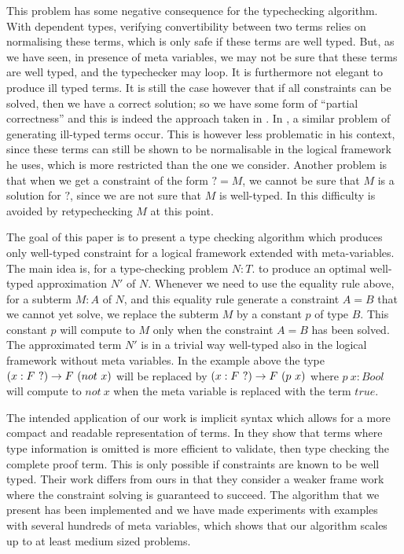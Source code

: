 This problem has some negative consequence for the typechecking algorithm. With dependent types,
verifying convertibility between two 
terms relies on normalising these terms, which is only safe if these terms are well typed. But, as we
have seen, in presence of meta variables, we may not be sure that these terms are well typed, and the
typechecker may loop. It is furthermore not elegant to produce ill typed terms.
It is still the case however that if all constraints can be solved, then we have a correct solution; so we
have some form of ``partial correctness'' and this is indeed the approach taken in 
\cite{magnussonnordstrom:alf,coquand:stt-lfm99}. In \cite{elliot:unification}, a similar problem of generating
ill-typed terms occur. This is however less problematic in his context, since these terms can still be shown
to be normalisable in the logical framework he uses, which is more restricted than the one we consider.
Another problem is that when we get a constraint of the form $? = M$, we cannot be sure that $M$ is a solution
for $?$, since we are not sure that $M$ is well-typed. In \cite{magnussonnordstrom:alf,coquand:stt-lfm99}
this difficulty is avoided by retypechecking $M$ at this point. 


 The goal of this paper is to present a type checking algorithm which produces only well-typed constraint  for a logical framework extended with meta-variables. The main idea is,
for a type-checking problem $N:T$.
to produce an optimal well-typed approximation $N'$ of $N$. 
Whenever we need to use the equality rule above, for a subterm $M:A$ of $N$, and this
equality rule generate a constraint $A=B$ that we cannot yet solve, we replace the subterm $M$
by a constant $p$ of type $B$. This constant $p$ will compute to $M$ only when the
constraint $A=B$ has been solved. The approximated term $N'$ is in a trivial way well-typed
also in the logical framework without meta variables. In the example above the type $(x:F ~?)\to{} {F~ (not~x)}$ will be replaced by $(x:F ~?)\to{} {F~ (p ~ x)}$ where $p~x : Bool$ will compute to $not ~ x$ when the meta variable is
replaced with the term $true$.


The intended application of our work is implicit syntax which allows for a more compact
and readable representation of terms. In \cite{necula:representation} they show that 
terms where type information is omitted is  more efficient to validate, then type checking the complete
proof term. This is only possible if constraints are known to be well typed. Their work differs from ours in 
that they consider a weaker frame work where the constraint solving is guaranteed to succeed.
The algorithm that we present has been implemented and we have made experiments with examples with several hundreds of meta variables, which shows that our algorithm scales up to at least medium sized problems.


